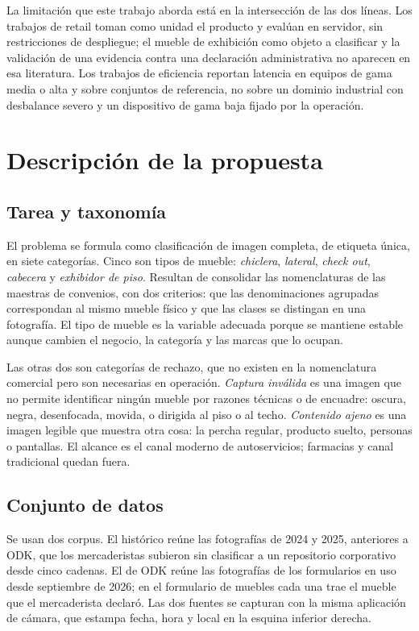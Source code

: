 \documentclass[conference]{IEEEtran}
\newcommand{\clase}[1]{\textit{#1}}
\begin{document}
La limitación que este trabajo aborda está en la intersección de las dos líneas. Los trabajos de retail toman como
unidad el producto y evalúan en servidor, sin restricciones de despliegue; el mueble de exhibición como objeto a
clasificar y la validación de una evidencia contra una declaración administrativa no aparecen en esa literatura.
Los trabajos de eficiencia reportan latencia en equipos de gama media o alta y sobre conjuntos de referencia, no
sobre un dominio industrial con desbalance severo y un dispositivo de gama baja fijado por la operación.

\section{Descripción de la propuesta}

\subsection{Tarea y taxonomía}

El problema se formula como clasificación de imagen completa, de etiqueta única, en siete categorías. Cinco son
tipos de mueble: \clase{chiclera}, \clase{lateral}, \clase{check out}, \clase{cabecera} y \clase{exhibidor de piso}.
Resultan de consolidar las nomenclaturas de las maestras de convenios, con dos criterios: que las denominaciones
agrupadas correspondan al mismo mueble físico y que las clases se distingan en una fotografía. El tipo de mueble es
la variable adecuada porque se mantiene estable aunque cambien el negocio, la categoría y las marcas que lo ocupan.

Las otras dos son categorías de rechazo, que no existen en la nomenclatura comercial pero son necesarias en
operación. \clase{Captura inválida} es una imagen que no permite identificar ningún mueble por razones técnicas o de
encuadre: oscura, negra, desenfocada, movida, o dirigida al piso o al techo. \clase{Contenido ajeno} es una imagen
legible que muestra otra cosa: la percha regular, producto suelto, personas o pantallas. El alcance es el canal
moderno de autoservicios; farmacias y canal tradicional quedan fuera.

\subsection{Conjunto de datos}

Se usan dos corpus. El histórico reúne las fotografías de 2024 y 2025, anteriores a ODK, que los mercaderistas
subieron sin clasificar a un repositorio corporativo desde cinco cadenas. El de ODK reúne las fotografías de los
formularios en uso desde septiembre de 2026; en el formulario de muebles cada una trae el mueble que el
mercaderista declaró. Las dos fuentes se capturan con la misma aplicación de cámara, que estampa fecha, hora y
local en la esquina inferior derecha.
\end{document}
